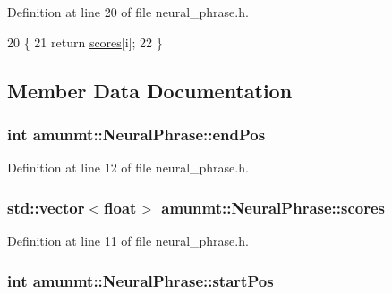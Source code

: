 Definition at line 20 of file neural\+\_\+phrase.\+h.


\begin{DoxyCode}
20                           \{
21       \textcolor{keywordflow}{return} \hyperlink{classamunmt_1_1NeuralPhrase_a56aa0c73fedf932885d0819024574b8e}{scores}[i];
22     \}
\end{DoxyCode}


\subsection{Member Data Documentation}
\subsubsection[{\texorpdfstring{end\+Pos}{endPos}}]{\setlength{\rightskip}{0pt plus 5cm}int amunmt\+::\+Neural\+Phrase\+::end\+Pos}\hypertarget{classamunmt_1_1NeuralPhrase_a2fb1906a21cf9f011fa6a125a7f3a2d1}{}\label{classamunmt_1_1NeuralPhrase_a2fb1906a21cf9f011fa6a125a7f3a2d1}


Definition at line 12 of file neural\+\_\+phrase.\+h.

\subsubsection[{\texorpdfstring{scores}{scores}}]{\setlength{\rightskip}{0pt plus 5cm}std\+::vector$<$float$>$ amunmt\+::\+Neural\+Phrase\+::scores}\hypertarget{classamunmt_1_1NeuralPhrase_a56aa0c73fedf932885d0819024574b8e}{}\label{classamunmt_1_1NeuralPhrase_a56aa0c73fedf932885d0819024574b8e}


Definition at line 11 of file neural\+\_\+phrase.\+h.

\subsubsection[{\texorpdfstring{start\+Pos}{startPos}}]{\setlength{\rightskip}{0pt plus 5cm}int amunmt\+::\+Neural\+Phrase\+::start\+Pos}\hypertarget{classamunmt_1_1NeuralPhrase_a5df2af7cda11b962e76712de6a555f30}{}\label{classamunmt_1_1NeuralPhrase_a5df2af7cda11b962e76712de6a555f30}


